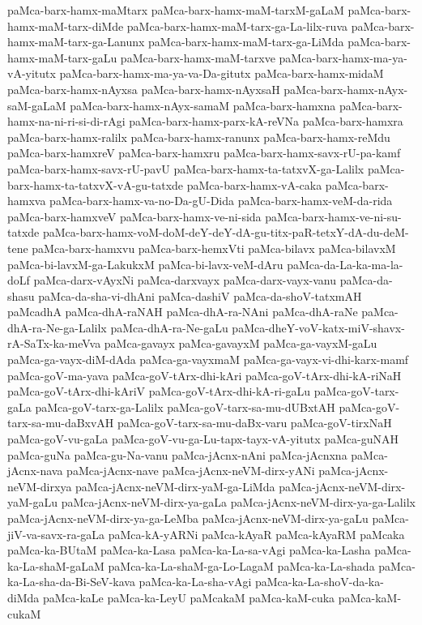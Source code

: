 {paMca-barx-hamx-maMtarx
paMca-barx-hamx-maM-tarxM-gaLaM
paMca-barx-hamx-maM-tarx-diMde
paMca-barx-hamx-maM-tarx-ga-La-lilx-ruva
paMca-barx-hamx-maM-tarx-ga-Lanunx
paMca-barx-hamx-maM-tarx-ga-LiMda
paMca-barx-hamx-maM-tarx-gaLu
paMca-barx-hamx-maM-tarxve
paMca-barx-hamx-ma-ya-vA-yitutx
paMca-barx-hamx-ma-ya-va-Da-gitutx
paMca-barx-hamx-midaM
paMca-barx-hamx-nAyxsa
paMca-barx-hamx-nAyxsaH
paMca-barx-hamx-nAyx-saM-gaLaM
paMca-barx-hamx-nAyx-samaM
paMca-barx-hamxna
paMca-barx-hamx-na-ni-ri-si-di-rAgi
paMca-barx-hamx-parx-kA-reVNa
paMca-barx-hamxra
paMca-barx-hamx-ralilx
paMca-barx-hamx-ranunx
paMca-barx-hamx-reMdu
paMca-barx-hamxreV
paMca-barx-hamxru
paMca-barx-hamx-savx-rU-pa-kamf
paMca-barx-hamx-savx-rU-pavU
paMca-barx-hamx-ta-tatxvX-ga-Lalilx
paMca-barx-hamx-ta-tatxvX-vA-gu-tatxde
paMca-barx-hamx-vA-caka
paMca-barx-hamxva
paMca-barx-hamx-va-no-Da-gU-Dida
paMca-barx-hamx-veM-da-rida
paMca-barx-hamxveV
paMca-barx-hamx-ve-ni-sida
paMca-barx-hamx-ve-ni-su-tatxde
paMca-barx-hamx-voM-doM-deY-deY-dA-gu-titx-paR-tetxY-dA-du-deM-tene
paMca-barx-hamxvu
paMca-barx-hemxVti
paMca-bilavx
paMca-bilavxM
paMca-bi-lavxM-ga-LakukxM
paMca-bi-lavx-veM-dAru
paMca-da-La-ka-ma-la-doLf
paMca-darx-vAyxNi
paMca-darxvayx
paMca-darx-vayx-vanu
paMca-da-shasu
paMca-da-sha-vi-dhAni
paMca-dashiV
paMca-da-shoV-tatxmAH
paMcadhA
paMca-dhA-raNAH
paMca-dhA-ra-NAni
paMca-dhA-raNe
paMca-dhA-ra-Ne-ga-Lalilx
paMca-dhA-ra-Ne-gaLu
paMca-dheY-voV-katx-miV-shavx-rA-SaTx-ka-meVva
paMca-gavayx
paMca-gavayxM
paMca-ga-vayxM-gaLu
paMca-ga-vayx-diM-dAda
paMca-ga-vayxmaM
paMca-ga-vayx-vi-dhi-karx-mamf
paMca-goV-ma-yava
paMca-goV-tArx-dhi-kAri
paMca-goV-tArx-dhi-kA-riNaH
paMca-goV-tArx-dhi-kAriV
paMca-goV-tArx-dhi-kA-ri-gaLu
paMca-goV-tarx-gaLa
paMca-goV-tarx-ga-Lalilx
paMca-goV-tarx-sa-mu-dUBxtAH
paMca-goV-tarx-sa-mu-daBxvAH
paMca-goV-tarx-sa-mu-daBx-varu
paMca-goV-tirxNaH
paMca-goV-vu-gaLa
paMca-goV-vu-ga-Lu-tapx-tayx-vA-yitutx
paMca-guNAH
paMca-guNa
paMca-gu-Na-vanu
paMca-jAcnx-nAni
paMca-jAcnxna
paMca-jAcnx-nava
paMca-jAcnx-nave
paMca-jAcnx-neVM-dirx-yANi
paMca-jAcnx-neVM-dirxya
paMca-jAcnx-neVM-dirx-yaM-ga-LiMda
paMca-jAcnx-neVM-dirx-yaM-gaLu
paMca-jAcnx-neVM-dirx-ya-gaLa
paMca-jAcnx-neVM-dirx-ya-ga-Lalilx
paMca-jAcnx-neVM-dirx-ya-ga-LeMba
paMca-jAcnx-neVM-dirx-ya-gaLu
paMca-jiV-va-savx-ra-gaLa
paMca-kA-yARNi
paMca-kAyaR
paMca-kAyaRM
paMcaka
paMca-ka-BUtaM
paMca-ka-Lasa
paMca-ka-La-sa-vAgi
paMca-ka-Lasha
paMca-ka-La-shaM-gaLaM
paMca-ka-La-shaM-ga-Lo-LagaM
paMca-ka-La-shada
paMca-ka-La-sha-da-Bi-SeV-kava
paMca-ka-La-sha-vAgi
paMca-ka-La-shoV-da-ka-diMda
paMca-kaLe
paMca-ka-LeyU
paMcakaM
paMca-kaM-cuka
paMca-kaM-cukaM
}
